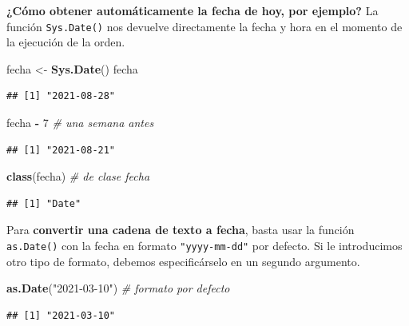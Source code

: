 \documentclass[11pt,]{book}
\newenvironment{Shaded}{\begin{snugshade}}{\end{snugshade}}
\newcommand{\CommentTok}[1]{\textcolor[rgb]{0.37,0.37,0.37}{\textit{#1}}}
\newcommand{\DecValTok}[1]{\textcolor[rgb]{0.06,0.06,0.06}{#1}}
\newcommand{\KeywordTok}[1]{\textcolor[rgb]{0.27,0.27,0.27}{\textbf{#1}}}
\newcommand{\NormalTok}[1]{#1}
\newcommand{\OperatorTok}[1]{\textcolor[rgb]{0.43,0.43,0.43}{\textbf{#1}}}
\newcommand{\StringTok}[1]{\textcolor[rgb]{0.5,0.5,0.5}{#1}}
\begin{document}
\textbf{¿Cómo obtener automáticamente la fecha de hoy, por ejemplo?} La función \texttt{Sys.Date()} nos devuelve directamente la fecha y hora en el momento de la ejecución de la orden.

\begin{Shaded}
\begin{Highlighting}[]
\NormalTok{fecha <-}\StringTok{ }\KeywordTok{Sys.Date}\NormalTok{()}
\NormalTok{fecha}
\end{Highlighting}
\end{Shaded}

\begin{verbatim}
## [1] "2021-08-28"
\end{verbatim}

\begin{Shaded}
\begin{Highlighting}[]
\NormalTok{fecha }\OperatorTok{-}\StringTok{ }\DecValTok{7} \CommentTok{# una semana antes}
\end{Highlighting}
\end{Shaded}

\begin{verbatim}
## [1] "2021-08-21"
\end{verbatim}

\begin{Shaded}
\begin{Highlighting}[]
\KeywordTok{class}\NormalTok{(fecha) }\CommentTok{# de clase fecha}
\end{Highlighting}
\end{Shaded}

\begin{verbatim}
## [1] "Date"
\end{verbatim}

Para \textbf{convertir una cadena de texto a fecha}, basta usar la función \texttt{as.Date()} con la fecha en formato \texttt{"yyyy-mm-dd"} por defecto. Si le introducimos otro tipo de formato, debemos especificárselo en un segundo argumento.

\begin{Shaded}
\begin{Highlighting}[]
\KeywordTok{as.Date}\NormalTok{(}\StringTok{"2021-03-10"}\NormalTok{) }\CommentTok{# formato por defecto}
\end{Highlighting}
\end{Shaded}

\begin{verbatim}
## [1] "2021-03-10"
\end{verbatim}
\end{document}
